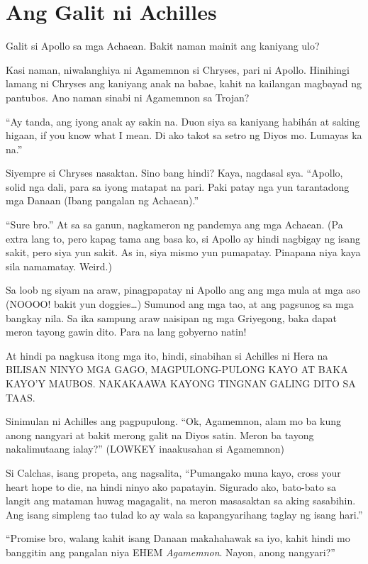 \documentclass[12pt,letterpaper]{report}
\begin{document}
\chapter{Ang Galit ni Achilles} %

Galit si Apollo sa mga Achaean. Bakit naman mainit ang kaniyang ulo?

Kasi naman, niwalanghiya ni Agamemnon si Chryses, pari ni Apollo. Hinihingi lamang ni Chryses ang kaniyang anak na babae, kahit na kailangan magbayad ng pantubos. Ano naman sinabi ni Agamemnon sa Trojan?

``Ay tanda, ang iyong anak ay sakin na. Duon siya sa kaniyang habih\'{a}n at saking higaan, if you know what I mean. Di ako takot sa setro ng Diyos mo. Lumayas ka na.''

Siyempre si Chryses nasaktan. Sino bang hindi? Kaya, nagdasal sya. ``Apollo, solid nga dali, para sa iyong matapat na pari. Paki patay nga yun tarantadong mga Danaan (Ibang pangalan ng Achaean).''


``Sure bro.'' At sa sa ganun, nagkameron ng pandemya ang mga Achaean. (Pa extra lang to, pero kapag tama ang basa ko, si Apollo ay hindi nagbigay ng isang sakit, pero siya yun sakit. As in, siya mismo yun pumapatay. Pinapana niya kaya sila namamatay. Weird.)

Sa loob ng siyam na araw, pinagpapatay ni Apollo ang ang mga mula at mga aso (NOOOO! bakit yun doggies\dots) Sumunod ang mga tao, at ang pagsunog sa mga bangkay nila. Sa ika sampung araw naisipan ng mga Griyegong, baka dapat meron tayong gawin dito. Para na lang gobyerno natin!

At hindi pa nagkusa itong mga ito, hindi, sinabihan si Achilles ni Hera na BILISAN NINYO MGA GAGO, MAGPULONG-PULONG KAYO AT BAKA KAYO'Y MAUBOS. NAKAKAAWA KAYONG TINGNAN GALING DITO SA TAAS.

Sinimulan ni Achilles ang pagpupulong. ``Ok, Agamemnon, alam mo ba kung anong nangyari at bakit merong galit na Diyos satin. Meron ba tayong nakalimutaang ialay?'' (LOWKEY inaakusahan si Agamemnon)

Si Calchas, isang propeta, ang nagsalita, ``Pumangako muna kayo, cross your heart hope to die, na hindi ninyo ako papatayin. Sigurado ako, bato-bato sa langit ang mataman huwag magagalit, na meron masasaktan sa aking sasabihin. Ang isang simpleng tao tulad ko ay wala sa kapangyarihang taglay ng isang hari.''

``Promise bro, walang kahit isang Danaan makahahawak sa iyo, kahit hindi mo banggitin ang pangalan niya EHEM \textit{Agamemnon}. Nayon, anong nangyari?''
\end{document}
